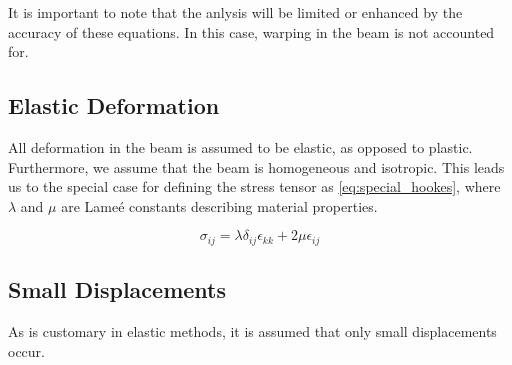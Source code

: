 It is important to note that the anlysis will be limited or enhanced by the accuracy of these equations.
In this case, warping in the beam is not accounted for.

\subsection{Elastic Deformation}
All deformation in the beam is assumed to be elastic, as opposed to plastic.
Furthermore, we assume that the beam is homogeneous and isotropic.
This leads us to the special case for defining the stress tensor as \cref{eq:special_hookes}, where $\lambda$ and $\mu$ are Lame\'e constants describing material properties.

\begin{equation}
\sigma_{ij}=\lambda\delta_{ij}\epsilon_{kk}+2\mu\epsilon_{ij}
\label{eq:special_hookes}
\end{equation}


\subsection{Small Displacements}
As is customary in elastic methods, it is assumed that only small displacements occur.
